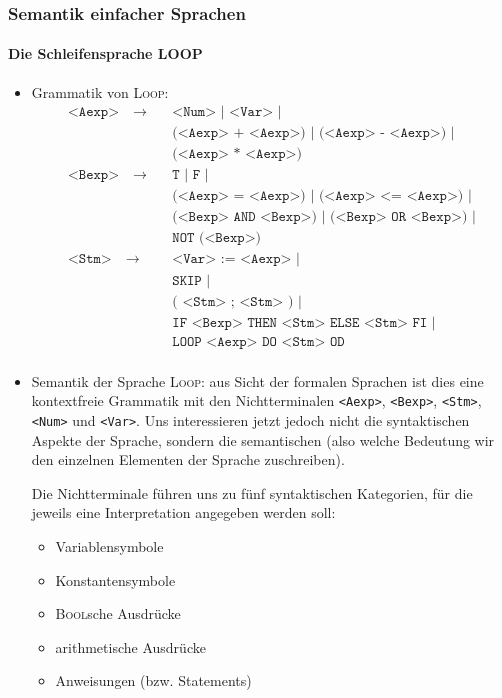\documentclass[
  a4paper,
  11pt,
]{scrartcl}
\begin{document}
\subsubsection{Semantik einfacher Sprachen}
\label{ssub:Semantik einfacher Sprachen}

\paragraph{Die Schleifensprache LOOP}
\label{par:die_schleifensprache_loop}

\begin{itemize}
  \item Grammatik von \textsc{Loop}:
    \begin{align*}
      \texttt{<Aexp>} \quad \rightarrow \quad
        & \texttt{<Num> | <Var> |}\\
        & \texttt{(<Aexp> + <Aexp>) | (<Aexp> - <Aexp>) |}\\
        & \texttt{(<Aexp> * <Aexp>)}\\
      \texttt{<Bexp>} \quad \rightarrow \quad
        & \texttt{T | F |}\\
        & \texttt{(<Aexp> = <Aexp>) | (<Aexp> <= <Aexp>) |}\\
        & \texttt{(<Bexp> AND <Bexp>) | (<Bexp> OR <Bexp>) |}\\
        & \texttt{NOT (<Bexp>)}\\
      \texttt{<Stm>} \quad \rightarrow \quad
        & \texttt{<Var> := <Aexp> |}\\
        & \texttt{SKIP |}\\
        & \texttt{( <Stm> ; <Stm> ) |}\\
        & \texttt{IF <Bexp> THEN <Stm> ELSE <Stm> FI |}\\
        & \texttt{LOOP <Aexp> DO <Stm> OD}\\
    \end{align*}

  \item Semantik der Sprache \textsc{Loop}:
    aus Sicht der formalen Sprachen ist dies eine kontextfreie Grammatik mit den
    Nichtterminalen \texttt{<Aexp>}, \texttt{<Bexp>}, \texttt{<Stm>},
    \texttt{<Num>} und \texttt{<Var>}. Uns interessieren jetzt jedoch nicht die
    syntaktischen Aspekte der Sprache, sondern die semantischen (also welche
    Bedeutung wir den einzelnen Elementen der Sprache zuschreiben).

    Die Nichtterminale führen uns zu fünf syntaktischen Kategorien, für die
    jeweils eine Interpretation angegeben werden soll:
    \begin{itemize}
      \item Variablensymbole
      \item Konstantensymbole
      \item \textsc{Bool}sche Ausdrücke
      \item arithmetische Ausdrücke
      \item Anweisungen (bzw. Statements)
    \end{itemize}


\end{itemize}
\end{document}
